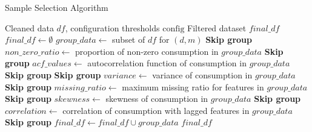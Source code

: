 \documentclass[journal]{IEEEtran}
\begin{document}
\begin{algorithm}[H]
\caption{Sample Selection Algorithm}
\begin{algorithmic}[1]
\Require Cleaned data $df$, configuration thresholds $\text{config}$
\Ensure Filtered dataset $final\_df$
\State $final\_df \gets \emptyset$
    \State $group\_data \gets$ subset of $df$ for $(d, m)$
        \State \textbf{Skip group} 
    \EndIf
    \State $non\_zero\_ratio \gets$ proportion of non-zero consumption in $group\_data$
        \State \textbf{Skip group} 
    \EndIf
    \State $acf\_values \gets$ autocorrelation function of consumption in $group\_data$
        \State \textbf{Skip group} 
    \EndIf
        \State \textbf{Skip group} 
    \EndIf
    \State $variance \gets$ variance of consumption in $group\_data$
        \State \textbf{Skip group} 
    \EndIf
    \State $missing\_ratio \gets$ maximum missing ratio for features in $group\_data$
        \State \textbf{Skip group} 
    \EndIf
    \State $skewness \gets$ skewness of consumption in $group\_data$
        \State \textbf{Skip group} 
    \EndIf
    \State $correlation \gets$ correlation of consumption with lagged features in $group\_data$
        \State \textbf{Skip group} 
    \EndIf
    \State $final\_df \gets final\_df \cup group\_data$
\EndFor
\State \Return $final\_df$
\end{algorithmic}
\end{algorithm}



\end{document}
